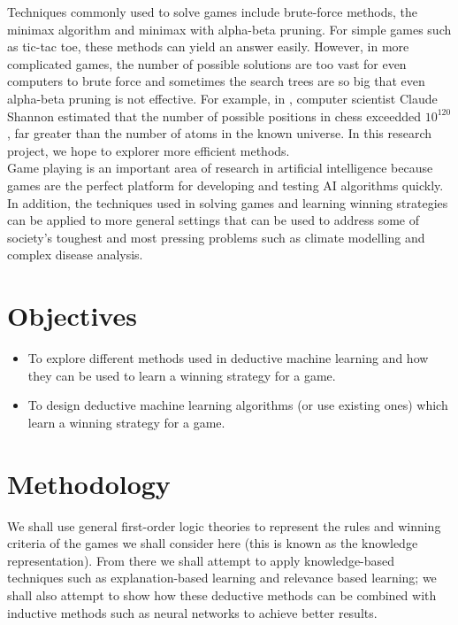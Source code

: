 \documentclass[11pt]{article}
\begin{document}
Techniques commonly used to solve games include brute-force methods, the minimax algorithm and minimax with alpha-beta pruning. For simple games such as tic-tac toe, these methods can yield an answer easily. However, in more complicated games, the number of possible solutions are too vast for even computers to brute force and sometimes the search trees are so big that even alpha-beta pruning is not effective. For example, in \cite{Shannon:1950:PCP}, computer scientist Claude Shannon estimated that the number of possible positions in chess exceedded ${10}^{120}$, far greater than the number of atoms in the known universe. In this research project, we hope to explorer more efficient methods.\\

Game playing is an important area of research in artificial intelligence because games are the perfect platform for developing and testing AI algorithms quickly. In addition, the techniques used in solving games and learning winning strategies can be applied to more general settings that can be used to address some of society's toughest and most pressing problems such as climate modelling and complex disease analysis.

\section{Objectives}
\begin{itemize}
\item To explore different methods used in deductive machine learning and how they can be used to learn a winning strategy for a game.
\item To design deductive machine learning algorithms (or use existing ones) which learn a winning strategy for a game.
\end{itemize}

\section{Methodology}
We shall use general first-order logic theories to represent the rules and winning criteria of the games we shall consider here (this is known as the knowledge representation). From there we shall attempt to apply knowledge-based techniques such as explanation-based learning and relevance based learning; we shall also attempt to show how these deductive methods can be combined with inductive methods such as neural networks to achieve better results.\\
\end{document}
